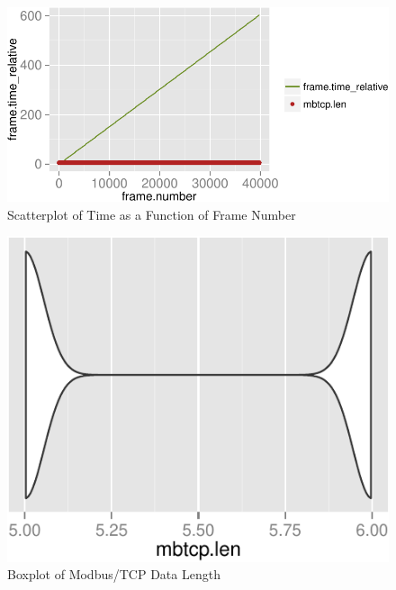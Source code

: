 \documentclass[11pt,]{article}
\begin{document}
\begin{figure}[h]

{\centering \includegraphics{thesis_files/figure-latex/unnamed-chunk-26-1} 

}

\caption{Scatterplot of Time as a Function of Frame Number}\label{fig:unnamed-chunk-26}
\end{figure}

\begin{figure}[h]

{\centering \includegraphics{thesis_files/figure-latex/unnamed-chunk-27-1} 

}

\caption{Boxplot of Modbus/TCP Data Length}\label{fig:unnamed-chunk-27}
\end{figure}
\end{document}
